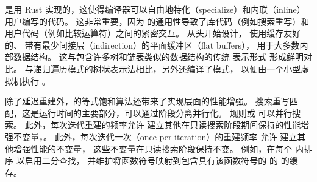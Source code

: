 \egg 是用 Rust 实现的，这使得编译器可以自由地特化（specialize）和内联（inline）用户编写的代码。
这非常重要，因为 \egg 的通用性导致了库代码（例如搜索重写）和用户代码（例如比较运算符）之间的紧密交互。
\egg 从头开始设计，
  使用缓存友好的、
  带有最少间接层（indirection）的平面缓冲区（flat buffers），%
  用于大多数内部数据结构。
这与包含许多树和链表类似的数据结构的传统 \egraphs 表示形式 \cite{nelson, simplify} 形成鲜明对比。
与递归遍历模式的树状表示法相比，\egg 另外还编译了模式，%
  以便由一个小型虚拟机执行 \cite{ematching}。

除了延迟重建外，\egg 的等式饱和算法还带来了实现层面的性能增强。
搜索重写匹配，这是运行时间的主要部分，可以通过阶段分离并行化。
规则或 \eclasses 可以并行搜索。
此外，每次迭代重建的频率允许 \egg 建立其他在只读搜索阶段期间保持的性能增强不变量，。
此外，每次迭代一次（once-per-iteration）的重建频率
  允许 \egg 建立其他增强性能的不变量，
  这些不变量在只读搜索阶段保持不变。
例如，\egg 在每个 \eclass 内排序 \enodes 以启用二分查找，
  并维护将函数符号映射到包含具有该函数符号的 \enodes 的 \eclasses 的缓存。

